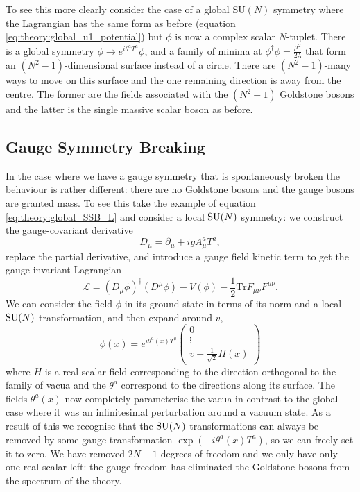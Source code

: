 To see this more clearly consider the case of a global $\mathrm{SU}(N)$ symmetry where the Lagrangian has the same form as before (equation \ref{eq:theory:global_u1_potential}) but $\phi$ is now a complex scalar $N$-tuplet. 
There is a global symmetry $\phi\rightarrow{e^{i\theta^{a}T^{a}}}\phi$, and a family of minima at $\phi^{\dag}\phi = \frac{\mu^{2}}{2\lambda}$ that form an $(N^{2}-1)$-dimensional surface instead of a circle. There are $(N^{2}-1)$-many ways to move on this surface and the one remaining direction is away from the centre. The former are the fields associated with the $(N^{2}-1)$ Goldstone bosons and the latter is the single massive scalar boson as before. 

\subsection{Gauge Symmetry Breaking}
In the case where we have a gauge symmetry that is spontaneously broken the behaviour is rather different: there are no Goldstone bosons and the gauge bosons are granted mass. 
To see this take the example of equation \ref{eq:theory:global_SSB_L} and consider a local ${\mathrm{SU}(N)}$ symmetry: we construct the gauge-covariant derivative
%
\begin{equation}
    \label{eq:theory:gauge_cov_deriv_u1}
    D_{\mu} = \partial_{\mu} + igA^{a}_{\mu}T^{a},
\end{equation}
%
replace the partial derivative, and introduce a gauge field kinetic term to get the gauge-invariant Lagrangian
\begin{equation}
    \label{eq:theory:gauge_u1_lagrangian}
    \mathcal{L} = (D_{\mu}\phi)^{\dag}(D^{\mu}\phi) - V(\phi) - \frac{1}{2}\mathrm{Tr}F_{\mu\nu}F^{\mu\nu}.
\end{equation}
%
We can consider the field $\phi$ in its ground state in terms of its norm and a local ${\mathrm{SU}(N)}$ transformation, and then expand around $v$,
\begin{equation}
    \label{eq:theory:phi_decomposition}
    \phi(x) = e^{i\theta^{a}(x)T^{a}}\begin{pmatrix}
        0\\
        \vdots\\
        v + \frac{1}{\sqrt{2}}H(x)
    \end{pmatrix}
\end{equation}
where $H$ is a real scalar field corresponding to the direction orthogonal to the family of vacua and  the $\theta^{a}$ correspond to the directions along its surface. The fields $\theta^{a}(x)$ now completely parameterise the vacua in contrast to the global case where it was an infinitesimal perturbation around a vacuum state.
As a result of this we recognise that the ${\mathrm{SU}(N)}$ transformations can always be removed by some gauge transformation $\exp(-i\theta^{a}(x)T^{a})$, so we can freely set it to zero. 
We have removed $2N-1$ degrees of freedom and we only have only one real scalar left: the gauge freedom has eliminated the Goldstone bosons from the spectrum of the theory.


